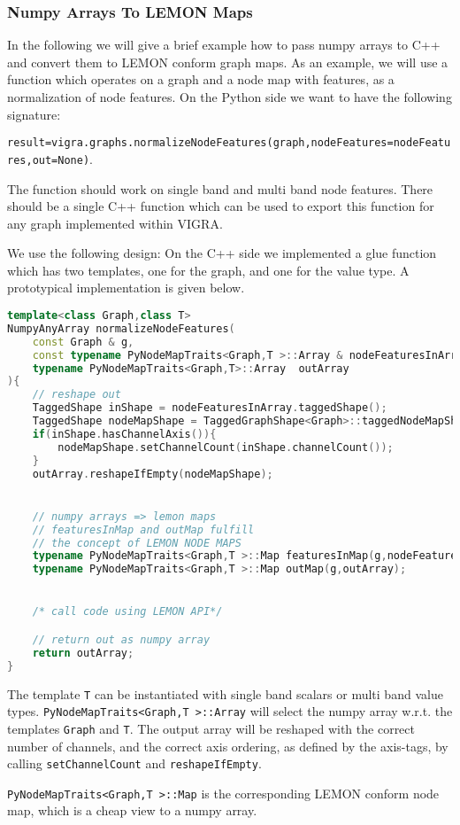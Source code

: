 \subsubsection{Numpy Arrays To LEMON Maps}


In the following we will give a brief example how to pass numpy arrays to C++
and convert them to LEMON conform graph maps.
As an example, we will use a function which operates on a graph and a node map with  features,
as a normalization of node features.
On the Python side we want to have the following signature:

\lstinline{result=vigra.graphs.normalizeNodeFeatures(graph,nodeFeatures=nodeFeatures,out=None)}.

The function should work on single band and multi band node features.
There should be a single C++ function which can be used to export
this function for any graph implemented within VIGRA.


\begin{minipage}{\textwidth}

We use the following design:
On the C++ side we implemented a glue function  which
has two templates, one for the graph, and one for the value type.
A prototypical implementation is given below.

\begin{lstlisting}[language=c++]
template<class Graph,class T>
NumpyAnyArray normalizeNodeFeatures(
    const Graph & g,
    const typename PyNodeMapTraits<Graph,T >::Array & nodeFeaturesInArray,
    typename PyNodeMapTraits<Graph,T>::Array  outArray 
){
    // reshape out 
    TaggedShape inShape = nodeFeaturesInArray.taggedShape();
    TaggedShape nodeMapShape = TaggedGraphShape<Graph>::taggedNodeMapShape(graph);
    if(inShape.hasChannelAxis()){
        nodeMapShape.setChannelCount(inShape.channelCount());
    }
    outArray.reshapeIfEmpty(nodeMapShape);


    // numpy arrays => lemon maps 
    // featuresInMap and outMap fulfill
    // the concept of LEMON NODE MAPS
    typename PyNodeMapTraits<Graph,T >::Map featuresInMap(g,nodeFeaturesInArray);
    typename PyNodeMapTraits<Graph,T >::Map outMap(g,outArray);


    /* call code using LEMON API*/

    // return out as numpy array
    return outArray;
}
\end{lstlisting}

The template \lstinline{T} can be instantiated with  single band scalars
or multi band value types.
\lstinline{PyNodeMapTraits<Graph,T >::Array} will select the numpy array w.r.t.
the templates \lstinline{Graph} and \lstinline{T}.
The output array will be reshaped with the correct number of channels,
and the correct axis ordering, as defined by the axis-tags, by calling \lstinline{setChannelCount}
and \lstinline{reshapeIfEmpty}.


\lstinline{PyNodeMapTraits<Graph,T >::Map} is the corresponding LEMON conform  node map,
which is a cheap view to a numpy array. 
\end{minipage}


